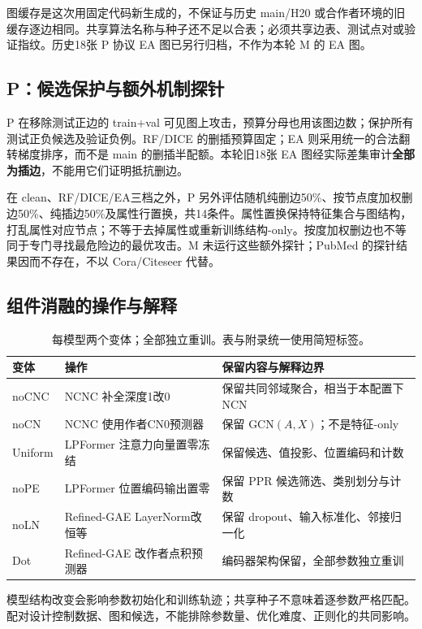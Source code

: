 图缓存是这次用固定代码新生成的，不保证与历史 main/H20 或合作者环境的旧缓存逐边相同。共享算法名称与种子还不足以合表；必须共享边表、测试点对或验证指纹。历史18张 P 协议 EA 图已另行归档，不作为本轮 M 的 EA 图。

\subsection{P：候选保护与额外机制探针}
P 在移除测试正边的 train+val 可见图上攻击，预算分母也用该图边数；保护所有测试正负候选及验证负例。RF/DICE 的删插预算固定；EA 则采用统一的合法翻转梯度排序，而不是 main 的删插半配额。本轮旧18张 EA 图经实际差集审计\textbf{全部为插边}，不能用它们证明抵抗删边。

在 clean、RF/DICE/EA三档之外，P 另外评估随机纯删边50\%、按节点度加权删边50\%、纯插边50\%及属性行置换，共14条件。属性置换保持特征集合与图结构，打乱属性对应节点；不等于去掉属性或重新训练结构-only。按度加权删边也不等同于专门寻找最危险边的最优攻击。M 未运行这些额外探针；PubMed 的探针结果因而不存在，不以 Cora/Citeseer 代替。

\subsection{组件消融的操作与解释}
\begin{table}[htbp]\centering\small
\caption{每模型两个变体；全部独立重训。表与附录统一使用简短标签。}\label{tab:ablations}
\begin{tabular}{lp{3.8cm}p{6.0cm}}\toprule
变体&操作&保留内容与解释边界\\\midrule
noCNC&NCNC 补全深度1改0&保留共同邻域聚合，相当于本配置下 NCN\\
noCN&NCNC 使用作者CN0预测器&保留 GCN$(A,X)$；不是特征-only\\
Uniform&LPFormer 注意力向量置零冻结&保留候选、值投影、位置编码和计数\\
noPE&LPFormer 位置编码输出置零&保留 PPR 候选筛选、类别划分与计数\\
noLN&Refined-GAE LayerNorm改恒等&保留 dropout、输入标准化、邻接归一化\\
Dot&Refined-GAE 改作者点积预测器&编码器架构保留，全部参数独立重训\\\bottomrule
\end{tabular}\end{table}
模型结构改变会影响参数初始化和训练轨迹；共享种子不意味着逐参数严格匹配。配对设计控制数据、图和候选，不能排除参数量、优化难度、正则化的共同影响。

